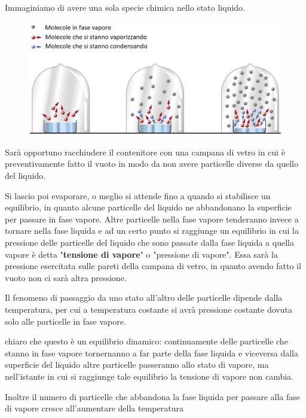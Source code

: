 Immaginiamo di avere una sola specie chimica nello stato liquido.

\begin{figure}[htp]
    \centering
    \includegraphics[width=15cm]{immagini/campana_di_vetro}
\end{figure}

Sarà opportuno racchiudere il contenitore con una campana di vetro in cui è preventivamente fatto il vuoto in modo da non avere particelle diverse da quello del liquido.

Si lascio poi evaporare, o meglio si attende fino a quando si stabilisce un equilibrio, in quanto alcune particelle del liquido ne abbandonano la superficie per passare in fase vapore. Altre particelle nella fase vapore tenderanno invece a tornare nella fase liquida e ad un certo punto si raggiunge un equilibrio in cui la pressione delle particelle del liquido che sono passate dalla fase liquida a quella vapore è detta "\textbf{tensione di vapore}" o "pressione di vapore". Essa sarà la pressione esercitata sulle pareti della campana di vetro, in quanto avendo fatto il vuoto non ci sarà altra pressione.

Il fenomeno di passaggio da uno stato all'altro delle particelle dipende dalla temperatura, per cui a temperatura costante si avrà pressione costante dovuta solo alle particelle in fase vapore.

\vspace{0.2cm}\E chiaro che questo è un equilibrio dinamico: continuamente delle particelle che stanno in fase vapore tornernanno a far parte della fase liquida e viceversa dalla superficie del liquido altre particelle passeranno allo stato di vapore, ma nell'istante in cui si raggiunge tale equilibrio la tensione di vapore non cambia.

Inoltre il numero di particelle che abbandona la fase liquida per passare alla fase di vapore cresce all'aumentare della temperatura

